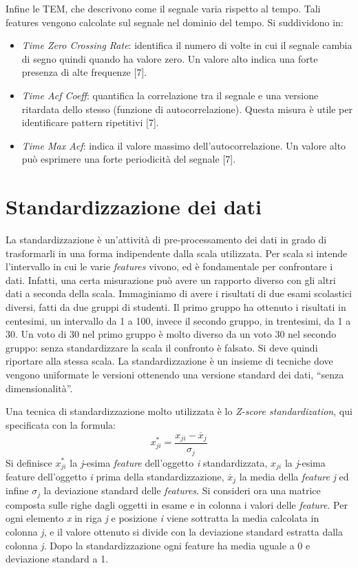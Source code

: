Infine le TEM, che descrivono come il segnale varia rispetto al tempo. Tali features vengono
calcolate sul segnale nel dominio del tempo. Si suddividono in:
\begin{itemize}
	 \item{\textit{Time Zero Crossing Rate}: identifica il numero di volte in cui il segnale cambia di
	 	segno quindi quando ha valore zero. Un valore alto indica una forte presenza di alte
	 	frequenze [7].}
	 \item{\textit{Time Acf Coeff}: quantifica la correlazione tra il segnale e una versione ritardata dello
	 	stesso (funzione di autocorrelazione). Questa misura è utile per identificare pattern
	 	ripetitivi [7].}
	 \item{\textit{Time Max Acf}: indica il valore massimo dell’autocorrelazione. Un valore alto può
	 	esprimere una forte periodicità del segnale [7].}
\end{itemize}	

\section{Standardizzazione dei dati}
La standardizzazione è un'attività di pre-processamento dei dati in grado di trasformarli in
una forma indipendente dalla scala utilizzata. Per scala si intende l’intervallo in cui le varie
\textit{features} vivono, ed è fondamentale per confrontare i dati. Infatti, una certa misurazione può
avere un rapporto diverso con gli altri dati a seconda della scala. Immaginiamo di avere i
risultati di due esami scolastici diversi, fatti da due gruppi di studenti. Il primo gruppo ha
ottenuto i risultati in centesimi, un intervallo da 1 a 100, invece il secondo gruppo, in
trentesimi, da 1 a 30. Un voto di 30 nel primo gruppo è molto diverso da un voto 30 nel
secondo gruppo: senza standardizzare la scala il confronto è falsato. Si deve quindi riportare
alla stessa scala. La standardizzazione è un insieme di tecniche dove vengono uniformate le
versioni ottenendo una versione standard dei dati, “senza dimensionalità”.

Una tecnica di standardizzazione molto utilizzata è lo \textit{Z-score standardization}, qui specificata
con la formula:
\begin{equation}
	x^{*}_{ji} = \frac{x_{ji} - \overline{x}_{j}}{\sigma_{j}}
\end{equation}
Si definisce \( x^{*}_{ji} \) la \textit{j}-esima \textit{feature} dell’oggetto \textit{i} standardizzata, 
\( x_{ji} \) la \textit{j}-esima feature dell’oggetto \textit{i} prima della standardizzazione, 
\( \overline{x}_{j} \) la media della \textit{feature} \textit{j} ed infine \( \sigma_{j} \) la 
deviazione standard delle \textit{features}. Si consideri ora una matrice composta sulle righe dagli
oggetti in esame e in colonna i valori delle \textit{feature}. Per ogni elemento \textit{x} in riga \textit{j} e posizione \textit{i} viene sottratta la media calcolata in colonna \textit{j}, e il valore ottenuto si divide con la deviazione
standard estratta dalla colonna \textit{j}. Dopo la standardizzazione ogni feature ha media uguale a 0
e deviazione standard a 1.

